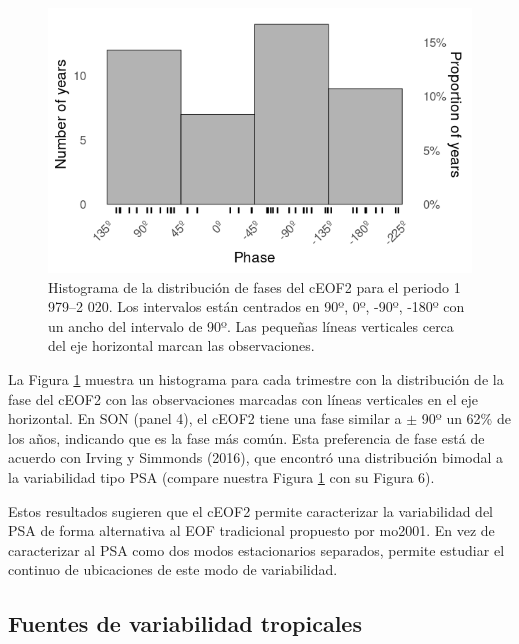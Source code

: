 \documentclass[12pt,oneside,a4paper]{reedthesis}
\begin{document}
\begin{figure}

{\centering \includegraphics{figures/20-ceofs/phase-histogram-1} 

}

\caption{Histograma de la distribución de fases del cEOF2 para el periodo 1 979--2 020.
Los intervalos están centrados en 90º, 0º, -90º, -180º con un ancho del intervalo de 90º.
Las pequeñas líneas verticales cerca del eje horizontal marcan las observaciones.}\label{fig:phase-histogram}
\end{figure}

La Figura \ref{fig:phase-histogram} muestra un histograma para cada trimestre con la distribución de la fase del cEOF2 con las observaciones marcadas con líneas verticales en el eje horizontal.
En SON (panel 4), el cEOF2 tiene una fase similar a \(\pm\) 90º un 62\% de los años, indicando que es la fase más común.
Esta preferencia de fase está de acuerdo con Irving y Simmonds (2016), que encontró una distribución bimodal a la variabilidad tipo PSA (compare nuestra Figura \ref{fig:phase-histogram} con su Figura 6).

Estos resultados sugieren que el cEOF2 permite caracterizar la variabilidad del PSA de forma alternativa al EOF tradicional propuesto por mo2001.
En vez de caracterizar al PSA como dos modos estacionarios separados, permite estudiar el continuo de ubicaciones de este modo de variabilidad.

\hypertarget{fuentes-ceof}{%
\subsection{Fuentes de variabilidad tropicales}\label{fuentes-ceof}}
\end{document}

